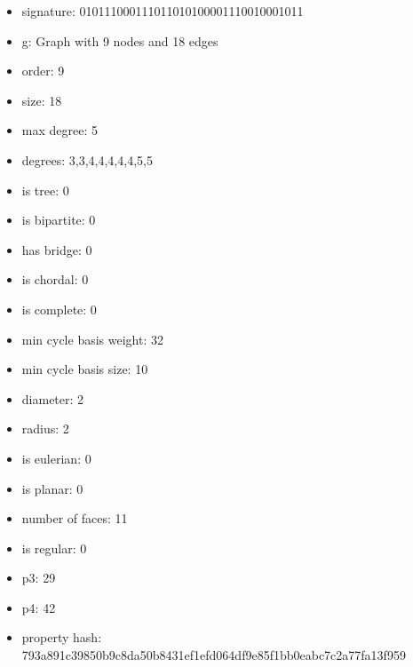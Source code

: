 \newpage
\begin{figure}
\end{figure}
\begin{itemize}
\item signature: 010111000111011010100001110010001011
\item g: Graph with 9 nodes and 18 edges
\item order: 9
\item size: 18
\item max degree: 5
\item degrees: 3,3,4,4,4,4,4,5,5
\item is tree: 0
\item is bipartite: 0
\item has bridge: 0
\item is chordal: 0
\item is complete: 0
\item min cycle basis weight: 32
\item min cycle basis size: 10
\item diameter: 2
\item radius: 2
\item is eulerian: 0
\item is planar: 0
\item number of faces: 11
\item is regular: 0
\item p3: 29
\item p4: 42
\item property hash: 793a891c39850b9c8da50b8431ef1efd064df9e85f1bb0eabc7c2a77fa13f959
\end{itemize}

